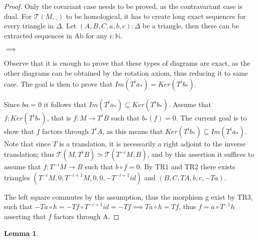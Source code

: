 \documentclass[12pt]{article}
\newtheorem{lemma}[theorem]{Lemma}
\theoremstyle{definition}
\theoremstyle{remark}
\begin{document}
        \begin{proof}
            Only the covariant case needs to be proved, as the contravariant case is dual. For $\mathcal{T}(M,\_)$ to be homological, it has to create long exact sequences for every triangle in $\Delta$. Let $(A,B,C,a,b,c):\Delta$ be a triangle, then there can be extracted sequences in Ab for any $i:\mathbb{N}$.

            \begin{center}
                 $\implies$
            \end{center}
            Observe that it is enough to prove that these types of diagrams are exact, as the other diagrams can be obtained by the rotation axiom, thus reducing it to same case. The goal is then to prove that $Im(T^ia_*)=Ker(T^ib_*)$.

            Since $ba=0$ it follows that $Im(T^ia_*) \subseteq Ker(T^ib_*)$. Assume that $f:Ker(T^ib_*)$, that is $f:M\rightarrow T^iB$ such that $b_*(f)=0$. The current goal is to show that $f$ factors through $T^iA$, as this means that $Ker(T^ib_*)\subseteq Im(T^ia_*)$. Note that since $T$ is a translation, it is necessarily a right adjoint to the inverse translation; thus $\mathcal{T}(M,T^iB) \simeq\mathcal{T}(T^{-i}M,B)$, and by this assertion it suffices to assume that $f:T^{-i}M\rightarrow B$ such that $b\circ f = 0$. By TR1 and TR2 there exists triangles $(T^{-i}M,0,T^{-i+1}M,0,0,-T^{-i+1}id)$ and $(B,C,TA,b,c,-Ta)$. 
            \begin{center}
            \end{center}
            The left square commutes by the assumption, thus the morphism g exist by TR3, such that $-Ta\circ h = -Tf\circ T^{-i+1}id = -Tf \implies Ta\circ h = Tf$, thus $f = a\circ T^{-1}h$ asserting that $f$ factors through A.
        \end{proof}
        \begin{lemma}
            
        \end{lemma}
\end{document}
